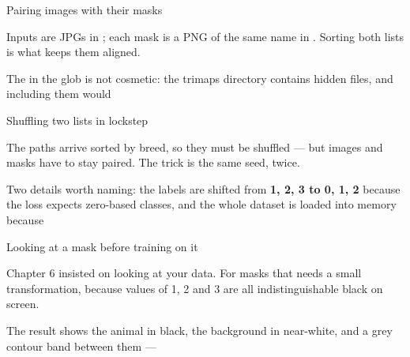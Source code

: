 \documentclass[aspectratio=169,11pt,t]{beamer}
\begin{document}
\begin{frame}[shrink=25]{Pairing images with their masks}
{\fontsize{9.4}{12.6}\selectfont\color{fg2}Inputs are JPGs in ; each mask is a PNG of the same name in . Sorting both lists is what keeps them aligned.\par}\vskip 4pt
\begin{iband}[amber]
The \inlinecode{[!.]} in the glob is not cosmetic: the trimaps directory contains hidden files, and including them would 
\end{iband}
\end{frame}

\begin{frame}[shrink=25]{Shuffling two lists in lockstep}
{\fontsize{9.4}{12.6}\selectfont\color{fg2}The paths arrive sorted by breed, so they must be shuffled --- but images and masks have to stay paired. The trick is the same seed, twice.\par}\vskip 4pt
\begin{iband}[signal]
Two details worth naming: the labels are shifted from \textbf{1, 2, 3 to 0, 1, 2} because the loss expects zero-based classes, and the whole dataset is loaded into memory because 
\end{iband}
\end{frame}

\begin{frame}[shrink=25]{Looking at a mask before training on it}
{\fontsize{9.4}{12.6}\selectfont\color{fg2}Chapter 6 insisted on looking at your data. For masks that needs a small transformation, because values of 1, 2 and 3 are all indistinguishable black on screen.\par}\vskip 4pt
{\fontsize{9.4}{12.6}\selectfont\color{fg2}The result shows the animal in black, the background in near-white, and a grey contour band between them --- \par}\vskip 4pt
\end{frame}
\end{document}
